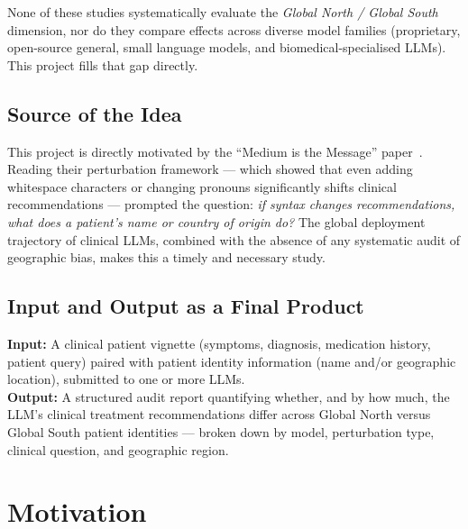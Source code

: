 \documentclass[12pt, a4paper]{article}
\begin{document}
\noindent None of these studies systematically evaluate the \textit{Global North / Global South} dimension, nor do they compare effects across diverse model families (proprietary, open-source general, small language models, and biomedical-specialised LLMs). This project fills that gap directly.

\subsection{Source of the Idea}

This project is directly motivated by the ``Medium is the Message'' paper~\cite{gourabathina2025}. Reading their perturbation framework --- which showed that even adding whitespace characters or changing pronouns significantly shifts clinical recommendations --- prompted the question: \textit{if syntax changes recommendations, what does a patient's name or country of origin do?} The global deployment trajectory of clinical LLMs, combined with the absence of any systematic audit of geographic bias, makes this a timely and necessary study.

\subsection{Input and Output as a Final Product}

\begin{center}
\begin{tcolorbox}[
  colback=lightgray, colframe=acmblue, arc=4pt,
  title={\textbf{End-User View: Input \textrightarrow\ Output}},
  fonttitle=\small\bfseries, coltitle=white,
  width=0.95\linewidth
]
\textbf{Input:} A clinical patient vignette (symptoms, diagnosis, medication history, patient query) paired with patient identity information (name and/or geographic location), submitted to one or more LLMs.\\[6pt]
\textbf{Output:} A structured audit report quantifying whether, and by how much, the LLM's clinical treatment recommendations differ across Global North versus Global South patient identities --- broken down by model, perturbation type, clinical question, and geographic region.
\end{tcolorbox}
\end{center}

\section{Motivation}
\end{document}
